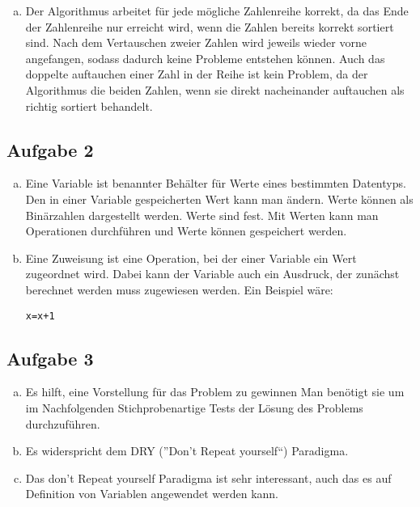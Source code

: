 \documentclass[11pt]{article}
\begin{document}
\begin{enumerate}[a)]
\item Der Algorithmus arbeitet f\"ur jede m\"ogliche Zahlenreihe korrekt, da das Ende der Zahlenreihe nur erreicht wird, wenn die Zahlen bereits korrekt sortiert sind. Nach dem Vertauschen zweier Zahlen wird jeweils wieder vorne angefangen, sodass dadurch keine Probleme entstehen k\"onnen. Auch das doppelte auftauchen einer Zahl in der Reihe ist kein Problem, da der Algorithmus die beiden Zahlen, wenn sie direkt nacheinander auftauchen als richtig sortiert behandelt.
\end{enumerate}

\subsection*{Aufgabe 2}
\begin{enumerate}[a)]

\item Eine Variable ist benannter Beh\"alter f\"ur Werte eines bestimmten Datentyps. Den in einer Variable gespeicherten Wert kann man \"andern. Werte k\"onnen als Bin\"arzahlen dargestellt werden. Werte sind fest. Mit Werten kann man Operationen durchf\"uhren und Werte k\"onnen gespeichert werden.

\item Eine Zuweisung ist eine Operation, bei der einer Variable ein Wert zugeordnet wird. Dabei kann der Variable auch ein Ausdruck, der zun\"achst  berechnet werden muss zugewiesen werden. Ein Beispiel w\"are:
\begin{lstlisting}
x=x+1
\end{lstlisting}

\end{enumerate}
\subsection*{Aufgabe 3}
\begin{enumerate}[a)]
  \item Es hilft, eine Vorstellung f\"ur das Problem zu gewinnen
    Man ben\"otigt sie um im Nachfolgenden Stichprobenartige Tests
    der L\"osung des Problems durchzuf\"uhren.
  \item
    Es widerspricht dem DRY (''Don't Repeat yourself``) Paradigma.
  \item
    Das don't Repeat yourself Paradigma ist sehr interessant, auch das es auf
    Definition von Variablen angewendet werden kann.
\end{enumerate}
\end{document}
